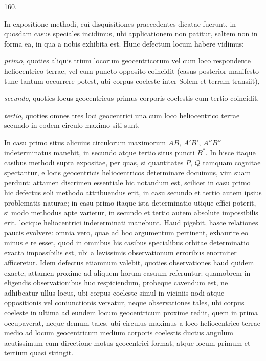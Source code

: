 \par{}\medskip
\begin{center}\hypertarget{native-222-article160}{}160.\end{center}
In expositione methodi, cui disquisitiones praecedentes dicatae fuerunt,
in quosdam casus speciales incidimus, ubi applicationem non patitur, saltem
non in forma ea, in qua a nobis exhibita est. Hunc defectum locum habere
vidimus:

\noindent\emph{primo}, quoties aliquis trium locorum geocentricorum vel cum loco respondente
heliocentrico terrae, vel cum puncto opposito coincidit (casus posterior
manifesto tunc tantum occurrere potest, ubi corpus coeleste inter Solem
et terram transiit),

\noindent\emph{secundo}, quoties locus geocentricus primus corporis coelestis cum tertio
coincidit,

\noindent\emph{tertio}, quoties omnes tres loci geocentrici una cum loco heliocentrico terrae
secundo in eodem circulo maximo siti sunt.

In casu primo situs alicuius circulorum maximorum $AB$, $A'B'$, $A''B''$
indeterminatus manebit, in secundo atque tertio situs puncti $B^*$. In hisce
itaque casibus methodi supra expositae, per quas, si quantitates $P$, $Q$ tamquam
cognitae spectantur, e locis geocentricis heliocentricos determinare docuimus,
vim suam perdunt: attamen discrimen essentiale hic notandum est, scilicet in
casu primo hic defectus soli methodo attribuendus erit, in casu secundo et
tertio autem ipsius problematis naturae; in casu primo itaque ista determinatio
utique effici poterit, si modo methodus apte varietur, in secundo et
tertio autem absolute impossibilis erit, locique heliocentrici indeterminati
manebunt. Haud pigebit, hasce relationes paucis evolvere: omnia vero, quae ad
hoc argumentum pertinent, exhaurire eo minus e re esset, quod in omnibus
his casibus specialibus orbitae determinatio exacta impossibilis est, ubi a
levissimis observationum erroribus enormiter afficeretur. Idem defectus etiamnum
valebit, quoties observationes haud quidem exacte, attamen proxime ad
aliquem horum casuum referuntur: quamobrem in eligendis observationibus
huc respiciendum, probeque cavendum est, ne adhibeatur ullus locus, ubi
corpus coeleste simul in viciniis nodi atque oppositionis vel coniunctionis
versatur, neque observationes tales, ubi corpus coeleste in ultima ad eundem
locum geocentricum proxime rediit, quem in prima occupaverat, neque demum
tales, ubi circulus maximus a loco heliocentrico terrae medio ad locum
geocentricum medium corporis coelestis ductus angulum acutissimum cum
directione motus geocentrici format, atque locum primum et tertium quasi
stringit.
